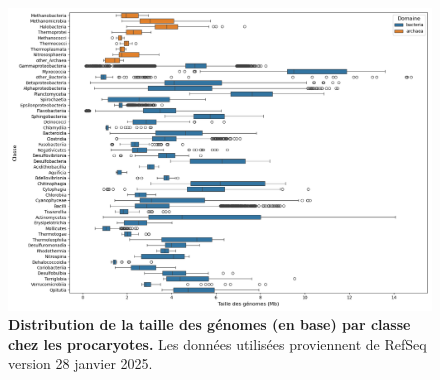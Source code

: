 \begin{figure}[htbp]
    \centering
    \includegraphics[width=\textwidth]{images/genome_size.png}
    \caption[Distribution de la taille des génomes chez les procaryotes]{\textbf{Distribution de la taille des génomes (en base) par classe chez les procaryotes.} Les données utilisées proviennent de RefSeq version 28 janvier 2025.}
    \label{fig:genome_size}
\end{figure}
